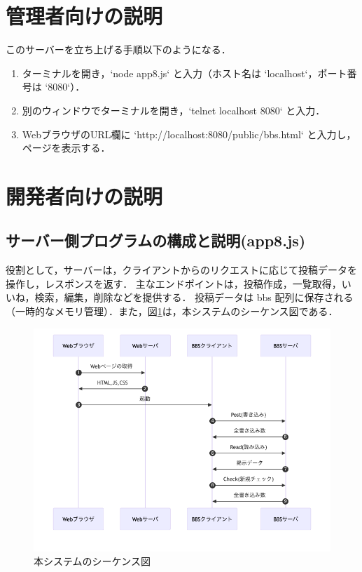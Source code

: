\documentclass[uplatex,dvipdfmx]{jsarticle}
\begin{document}
\section{管理者向けの説明}
このサーバーを立ち上げる手順以下のようになる．
\begin{enumerate}
  \item ターミナルを開き，`node app8.js` と入力（ホスト名は `localhost`，ポート番号は `8080`）．
  \item 別のウィンドウでターミナルを開き，`telnet localhost 8080` と入力．
  \item WebブラウザのURL欄に `http://localhost:8080/public/bbs.html` と入力し，ページを表示する．
\end{enumerate}

\section{開発者向けの説明}
\subsection{サーバー側プログラムの構成と説明(app8.js)}
役割として，サーバーは，クライアントからのリクエストに応じて投稿データを操作し，レスポンスを返す．
主なエンドポイントは，投稿作成，一覧取得，いいね，検索，編集，削除などを提供する．
投稿データは bbs 配列に保存される（一時的なメモリ管理）．また，図\ref{1}は，本システムのシーケンス図である．







\begin{figure}[H]
  \centering
      \includegraphics[width=15cm]{Figs/1.png}
      \caption{本システムのシーケンス図}
      \label{1}
\end{figure}
\end{document}
